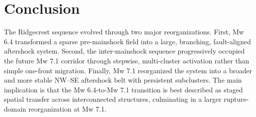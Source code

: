 \documentclass[11pt]{article}
\begin{document}
\section{Conclusion}
The Ridgecrest sequence evolved through two major reorganizations. First, Mw 6.4 transformed a sparse pre-mainshock field into a large, branching, fault-aligned aftershock system. Second, the inter-mainshock sequence progressively occupied the future Mw 7.1 corridor through stepwise, multi-cluster activation rather than simple one-front migration. Finally, Mw 7.1 reorganized the system into a broader and more stable NW--SE aftershock belt with persistent subclusters. The main implication is that the Mw 6.4-to-Mw 7.1 transition is best described as staged spatial transfer across interconnected structures, culminating in a larger rupture-domain reorganization at Mw 7.1.
\end{document}
